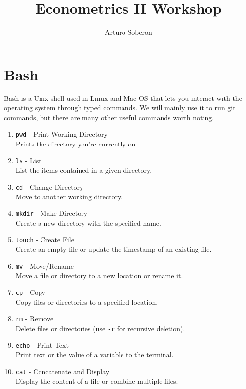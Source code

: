 \documentclass[12pt]{article}
\begin{document}
\title{Econometrics II Workshop}
\author{Arturo Soberon}
\date{}
\maketitle

\setcounter{section}{0}
\section{Bash}
Bash is a Unix shell used in Linux and Mac OS that lets you interact with
the operating system through typed commands. We will mainly use it to run
git commands, but there are many other useful commands worth noting.

\begin{enumerate}
    \item \texttt{pwd} - Print Working Directory \\
        Prints the directory you're currently on.
    \item \texttt{ls} - List \\
        List the items contained in a given directory.
    \item \texttt{cd} - Change Directory \\
        Move to another working directory.
    \item \texttt{mkdir} - Make Directory \\
        Create a new directory with the specified name.
    \item \texttt{touch} - Create File \\
        Create an empty file or update the timestamp of an existing file.
    \item \texttt{mv} - Move/Rename \\
        Move a file or directory to a new location or rename it.
    \item \texttt{cp} - Copy \\
        Copy files or directories to a specified location.
    \item \texttt{rm} - Remove \\
        Delete files or directories (use \texttt{-r} for recursive deletion).
    \item \texttt{echo} - Print Text \\
        Print text or the value of a variable to the terminal.
    \item \texttt{cat} - Concatenate and Display \\
        Display the content of a file or combine multiple files.
\end{enumerate}
\end{document}
